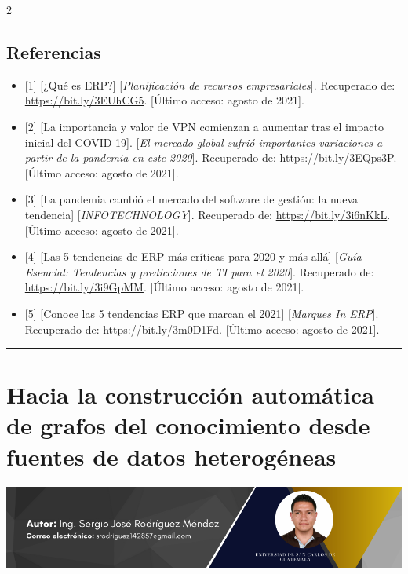 \documentclass[12pt,spanish,Letterpaper,openany]{book}
\newcommand{\HRule}{\begin{center}\rule{0.5\linewidth}{0.2mm}\end{center}}
\begin{document}
\begin {multicols}{2}
\hypertarget{referencias-6}{%
\section{Referencias}\label{referencias-6}}

\begin{itemize}
\item
  {[}1{]} {[}¿Qué es ERP?{]} {[}\emph{Planificación de recursos empresariales}{]}. Recuperado de: \url{https://bit.ly/3EUhCG5}. {[}Último acceso: agosto de 2021{]}.
\item
  {[}2{]} {[}La importancia y valor de VPN comienzan a aumentar tras el impacto inicial del COVID-19{]}. {[}\emph{El mercado global sufrió importantes variaciones a partir de la pandemia en este 2020}{]}. Recuperado de: \url{https://bit.ly/3EQps3P}. {[}Último acceso: agosto de 2021{]}.
\item
  {[}3{]} {[}La pandemia cambió el mercado del software de gestión: la nueva tendencia{]} {[}\emph{INFOTECHNOLOGY}{]}. Recuperado de: \url{https://bit.ly/3i6nKkL}. {[}Último acceso: agosto de 2021{]}.
\item
  {[}4{]} {[}Las 5 tendencias de ERP más críticas para 2020 y más allá{]} {[}\emph{Guía Esencial: Tendencias y predicciones de TI para el 2020}{]}. Recuperado de: \url{https://bit.ly/3i9GpMM}. {[}Último acceso: agosto de 2021{]}.
\item
  {[}5{]} {[}Conoce las 5 tendencias ERP que marcan el 2021{]} {[}\emph{Marques In ERP}{]}. Recuperado de: \url{https://bit.ly/3m0D1Fd}. {[}Último acceso: agosto de 2021{]}.
\end{itemize}

\end {multicols}

\medskip

\HRule

\medskip

\hypertarget{mendez}{%
\chapter{Hacia la construcción automática de grafos del conocimiento desde fuentes de datos heterogéneas}\label{mendez}}

\begin{center}\includegraphics[width=1\linewidth]{images/Sergio} \end{center}
\end{document}
